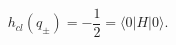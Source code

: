 \begin{equation}
\label{classhamil}
h_{cl}(q_{\pm})=-\frac{1}{2}=\langle 0|H|0 \rangle.
\end{equation}

